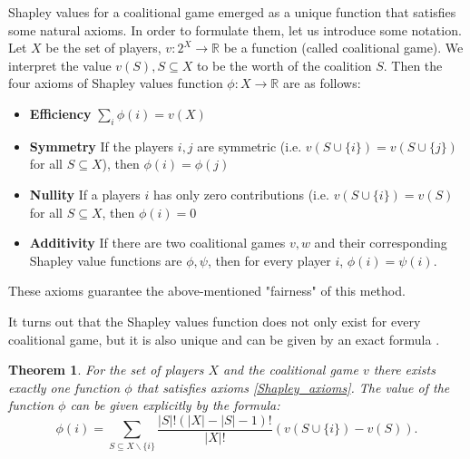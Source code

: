 \documentclass[magisterska,en]{pracamgr}
\newtheorem{thm}{Theorem}[section]
\begin{document}
Shapley values for a coalitional game emerged as a unique function that satisfies some natural axioms. In order to formulate them, let us introduce some notation.  Let $X$ be the set of players, $v: 2^X \rightarrow \mathbb{R}$ be a function (called coalitional game). We interpret the value $v(S), S \subseteq X$ to be the worth of the coalition $S$. Then the four axioms of Shapley values function $\phi:X  \rightarrow \mathbb{R}$ are as follows:
\begin{itemize}
\item \textbf{Efficiency}  $\sum_i  \phi(i) = v(X)$
\item \textbf{Symmetry} If the players $i, j$ are symmetric (i.e. $v(S\cup \{i\}) = v(S \cup \{j\})$ for all $S \subseteq X$), then $\phi(i) = \phi(j)$
\item \textbf{Nullity} If a players $i$ has only zero contributions (i.e. $v(S\cup \{i\}) = v(S)$ for all $S \subseteq X$, then $\phi(i) = 0$
\item \textbf{Additivity} If there are two coalitional games $v, w$ and their corresponding Shapley value functions are $\phi, \psi$, then for every player $i$, $\phi(i) = \psi(i)$.
\label{Shapley_axioms}
\end{itemize}
These axioms guarantee the above-mentioned "fairness" of this method. 

It turns out that the Shapley values function does not only exist for every coalitional game, but it is also unique and can be given by an exact formula \cite{ShapleyValues}.

\begin{thm}\label{shap_def}
  For the set of players $X$ and the coalitional game $v$ there exists exactly one function $\phi$ that satisfies axioms \ref{Shapley_axioms}.
The value of the function $\phi$ can be given explicitly by the formula:
  \begin{equation*}
      \phi (i) = \sum_{S\subseteq X\backslash \{i\}} \frac{|S|!(|X|-|S|-1)!}{|X|!}\left(v(S \cup \{i\}) - v(S)\right).
  \end{equation*}
\end{thm}
\end{document}
